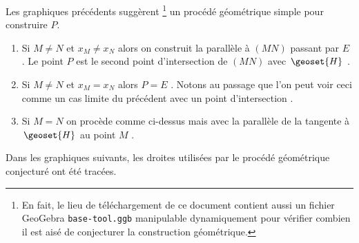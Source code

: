 \begin{multicols}{2}
	\bigskip

\end{multicols}


\bigskip
	

Les graphiques précédents suggèrent
\footnote{
	En fait, le lieu de téléchargement de ce document contient aussi un fichier GeoGebra \texttt{base-tool.ggb} manipulable dynamiquement pour vérifier combien il est aisé de conjecturer la construction géométrique.
}
un procédé géométrique simple pour construire $P$.

\begin{enumerate}
	\item Si $M \neq N$ et $x_M \neq x_N$ alors on construit la parallèle à $(MN)$ passant par $E$ . Le point $P$ est le second point d'intersection de $(MN)$ avec $\geoset{H}$ .


	\item Si $M \neq N$ et $x_M = x_N$ alors $P = E$ . Notons au passage que l'on peut voir ceci comme un cas limite du précédent avec un point d'intersection .


	\item Si $M = N$ on procède comme ci-dessus mais avec la parallèle de la tangente à $\geoset{H}$ au point $M$ .
\end{enumerate}


Dans les graphiques suivants, les droites utilisées par le procédé géométrique conjecturé ont été tracées.


\medskip


